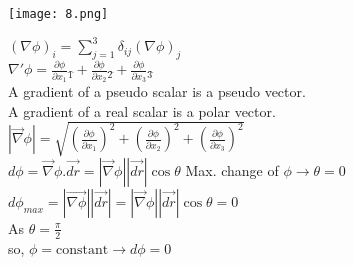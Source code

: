 \documentclass[12]{article}
\begin{document}
\begin{center}
\texttt{[image: 8.png]}
\end{center}
\newpage

$\left(\nabla \phi\right)_{i}=\sum_{j=1}^{3} \delta_{ij}(\nabla \phi)_{j}$\\

$\nabla' \phi=\frac{\partial \phi}{\partial x_{1}}\hat{_{1}}+\frac{\partial \phi}{\partial x_{2}}\hat{_{2}}+\frac{\partial \phi}{\partial x_{3}}\hat{_{3}}$\\

A gradient of a pseudo scalar is a pseudo vector.\\

A gradient of a real scalar is a polar vector.\\

$|\vec{\nabla} \phi|=\sqrt{\left(\frac{\partial \phi}{\partial x_{1}}\right)^{2}+\left(\frac{\partial \phi}{\partial x_{2}}\right)^{2}+\left(\frac{\partial \phi}{\partial x_{3}}\right)^{2}}$\\

$d \phi = \vec{\nabla} \phi
. \vec{dr}=|\vec{\nabla} \phi||\vec{dr}|\cos \theta$ \hspace{1cm} Max. change of $\phi \rightarrow \theta =0$\\

$d \phi_{max}=|\vec{\nabla \phi}||\vec{dr}|=|\vec{\nabla} \phi||\vec{dr}|\cos \theta=0$\\

As $\theta =\frac{\pi}{2}$\\

so, $\phi= \mbox{constant}
\rightarrow d \phi=0$\\
 
\end{document}
